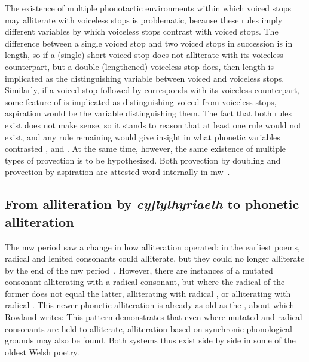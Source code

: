 The existence of multiple phonotactic environments within which voiced stops may alliterate with voiceless stops is problematic, because these rules imply different variables by which voiceless stops contrast with voiced stops. The difference between a single voiced stop and two voiced stops in succession is in length, so if a (single) short voiced stop does not alliterate with its voiceless counterpart, but a double (lengthened) voiceless stop does, then  length is implicated as the distinguishing variable between voiced and voiceless stops. Similarly, if a voiced stop followed by  corresponds with its voiceless counterpart, some feature of  is implicated as distinguishing voiced from voiceless stops, \ie aspiration would be the variable distinguishing them. The fact that both rules exist does not make sense, so it stands to reason that at least one rule would not exist, and any rule remaining would give insight in what phonetic variables contrasted , and . At the same time, however, the same existence of multiple types of provection is to be hypothesized. Both provection by doubling and provection by aspiration are attested word-internally in \gls{mw}~\parencite[\S 17]{evans_grammar_1964}.


\subsection{From alliteration by \textit{cyflythyriaeth} to phonetic alliteration}
The \gls{mw} period saw a change in how alliteration operated: in the earliest poems, radical and lenited consonants could alliterate, but they could no longer alliterate by the end of the \gls{mw} period~\parencite[339]{rowland_early_1990}. However, there are instances of a mutated consonant alliterating with a radical consonant, but where the radical of the former does not equal the latter, \eg {} alliterating with radical , or  alliterating with radical . This newer phonetic alliteration is already as old as the , about which Rowland writes: 
This pattern demonstrates that even where mutated and radical consonants are held to alliterate, alliteration based on synchronic phonological grounds may also be found. Both systems thus exist side by side in some of the oldest Welsh poetry. 

